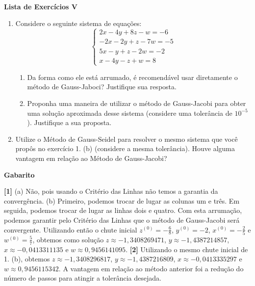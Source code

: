 \documentclass[12pt,a4paper]{article}
\begin{document}
\begin{center}
 \textbf{Lista de Exercícios V}
\end{center}

\begin{enumerate}
  
  \item Considere o seguinte sistema de equações:
  $$%
   \begin{cases}
    2x - 4y + 8z  - w = -6 \\
    -2x  - 2y + z - 7w = -5 \\
    5x  - y + z - 2w = -2 \\
    x - 4y - z + w = 8
   \end{cases}
  $$

  \begin{enumerate}
   \item Da forma como ele está arrumado, é recomendável usar diretamente o método de Gauss-Jaboci? Justifique sua resposta.
   \item Proponha uma maneira de utilizar o método de Gauss-Jacobi para obter uma solução aproximada desse sistema (considere uma tolerância de $10^{-5}$). 
         Justifique a sua proposta.
  \end{enumerate}


  \item Utilize o Método de Gauss-Seidel para resolver o mesmo sistema que você propôs no exercício 1. (b) (considere a mesma tolerância). Houve alguma vantagem em relação ao 
Método de Gauss-Jacobi?

\end{enumerate}

\begin{center}
\textbf{Gabarito}
\end{center} 
\textbf{[1]} (a) Não, pois usando o Critério das Linhas não temos a garantia da convergência. 
(b) Primeiro, podemos trocar de lugar as colunas um e três. Em seguida, podemos trocar de lugar as linhas dois e quatro. Com esta arrumação,
podemos garantir pelo Critério das Linhas que o método de Gauss-Jacobi será convergente. Utilizando então o chute inicial $z^{(0)} = -\frac{6}{8}$, 
$y^{(0)} = -2$, $x^{(0)} = -\frac{2}{5}$ e $w^{(0)} = \frac{5}{7}$, obtemos como solução $z \approx -1,3408269471$, $y \approx -1,4387214857$, 
$x\approx -0,0413311135$ e $w\approx 0,9456141095$. 
\textbf{[2]} Utilizando o mesmo chute inicial de 1. (b), obtemos $z \approx -1,3408296817$, $y \approx -1,4387216809$, 
$x\approx -0,0413335297$ e $w\approx 0,9456115342$. A vantagem em relação ao método anterior foi a redução do número de passos para atingir a 
tolerância desejada.
\end{document}
